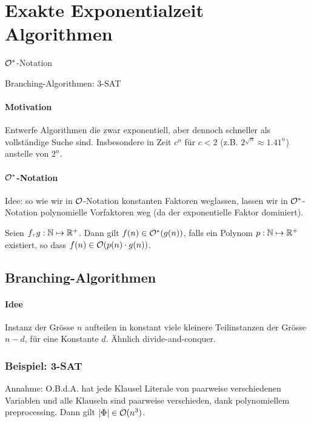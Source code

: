 \section{Exakte Exponentialzeit Algorithmen}

\begin{takeaway}
    \item $\mathcal{O}^*$-Notation
    \item Branching-Algorithmen: 3-SAT
\end{takeaway}

\paragraph{Motivation}
Entwerfe Algorithmen die zwar exponentiell, aber dennoch schneller als vollständige Suche sind.
Insbesondere in Zeit $c^n$ für $c < 2$ (z.B. $2^{\sqrt{n}} \approx 1.41^n$) anstelle von $2^n$.

\paragraph{$\mathcal{O}^*$-Notation}
Idee: so wie wir in $\mathcal{O}$-Notation konstanten Faktoren weglassen, lassen wir in $\mathcal{O}^*$-Notation
polynomielle Vorfaktoren weg (da der exponentielle Faktor dominiert).

Seien $f,g : \mathbb{N} \mapsto \mathbb{R}^+$. Dann gilt $f(n) \in \mathcal{O}^*(g(n))$, falls ein Polynom $p : \mathbb{N} \mapsto \mathbb{R}^+$
existiert, so dass $f(n) \in \mathcal{O}(p(n) \cdot g(n))$.


\subsection{Branching-Algorithmen}

\paragraph{Idee}
Instanz der Grösse $n$ aufteilen in konstant viele kleinere Teilinstanzen der Grösse $n-d$, für eine Konstante $d$.
Ähnlich divide-and-conquer.


\subsubsection{Beispiel: 3-SAT}

Annahme: O.B.d.A. hat jede Klausel Literale von paarweise verschiedenen Variablen und alle Klauseln sind
paarweise verschieden, dank polynomiellem preprocessing.
Dann gilt $|\Phi| \in \mathcal{O}(n^3)$.

